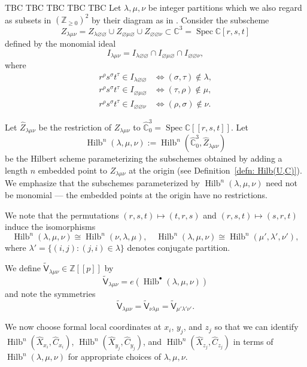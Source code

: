\documentclass[12pt]{amsart}
\theoremstyle{definition}
\newcommand{\CC} {\mathbb{C}}          %
\newcommand{\ZZ} {\mathbb{Z}}		%
\newcommand{\sfVtilde}{\widetilde{\mathsf{V}}}
\newcommand{\Hilb}{\operatorname{Hilb}}
\newcommand{\Spec}{\operatorname{Spec}}
\renewcommand{\emptyset}{\varnothing}
\renewcommand{\hat}{\widehat}
\newcommand{\Xhat}{\widehat{X}}
\begin{document}
TBC TBC TBC TBC TBC  Let $\lambda ,\mu ,\nu$ be integer partitions which we also regard as
subsets in $(\ZZ_{\geq 0})^{2}$ by their diagram as in
\cite{Bryan-Kool-Young}. Consider the subscheme
\[
Z_{\lambda \mu \nu}=Z_{\lambda \emptyset \emptyset}\cup
Z_{\emptyset \mu \emptyset}\cup Z_{\emptyset \emptyset \nu } \subset
\CC^{3}=\Spec \CC [r,s,t]
\]
defined by the monomial ideal
\[
I_{\lambda \mu \nu} = I_{\lambda \emptyset \emptyset}\cap I_{\emptyset \mu \emptyset}\cap I_{\emptyset \emptyset \nu},
\]
where 
\begin{align*}
r^{\rho}s^{\sigma}t^{\tau}\in I_{\lambda \emptyset \emptyset} & \iff
(\sigma ,\tau )\notin \lambda ,\\
r^{\rho}s^{\sigma}t^{\tau}\in I_{\emptyset \mu  \emptyset} & \iff
(\tau,\rho  )\notin \mu ,\\
r^{\rho}s^{\sigma}t^{\tau}\in I_{\emptyset \emptyset \nu } & \iff
(\rho ,\sigma  )\notin \nu . 
\end{align*}

Let $\hat{Z}_{\lambda \mu \nu}$ be the restriction of $Z_{\lambda \mu
\nu}$ to $\hat{\CC}^{3}_{0} = \Spec \CC [[r,s,t]]$. Let
\begin{equation} \label{defHilblambdamunu}
\Hilb^{n}(\lambda ,\mu ,\nu) := \Hilb^{n}(\hat{\CC}^{3}_{0}, \hat{Z}_{\lambda \mu \nu} )
\end{equation}
be the Hilbert scheme parameterizing the subschemes obtained by adding
a length $n$ embedded point to $Z_{\lambda \mu \nu}$ at the origin
(see Definition~\ref{defn: Hilb(U,C)}). We emphasize that the
subschemes parameterized by $\Hilb^{n}(\lambda ,\mu ,\nu )$ need not
be monomial --- the embedded points at the origin have no
restrictions. 

We note that the permutations
$(r,s,t)\mapsto (t,r,s)$ and $(r,s,t)\mapsto (s,r,t)$ induce the
isomorphisms
\[
\Hilb^{n}(\lambda ,\mu ,\nu )\cong \Hilb^{n}(\nu,\lambda,\mu   ),\quad
\Hilb^{n}(\lambda ,\mu ,\nu )\cong \Hilb^{n}( \mu ',\lambda ',\nu ' ),
\]
where $\lambda' = \{(i,j) : (j,i) \in \lambda\}$ denotes conjugate partition.

We define $\sfVtilde_{\lambda
\mu \nu}\in \ZZ [[p]]$ by
\[
\sfVtilde_{\lambda \mu \nu} = e\left(\Hilb^{\bullet}(\lambda ,\mu ,\nu ) \right)
\]
and note the symmetries 
\[
\sfVtilde_{\lambda \mu \nu}=\sfVtilde_{ \nu \lambda \mu
}=\sfVtilde_{\mu '\lambda '\nu '}.
\]


We now choose formal local coordinates at $x_{i}$, $y_{j}$, and
$z_{j}$ so that we can identify
$\Hilb^{n}(\Xhat_{x_{i}},\hat{C}_{x_{i}})$,
$\Hilb^{n}(\Xhat_{y_{j}},\hat{C}_{y_{j}})$, and
$\Hilb^{n}(\Xhat_{z_{j}},\hat{C}_{z_{j}})$ in terms of
$\Hilb^{n}(\lambda ,\mu ,\nu )$ for appropriate choices of $\lambda
,\mu ,\nu$. 
\end{document}

